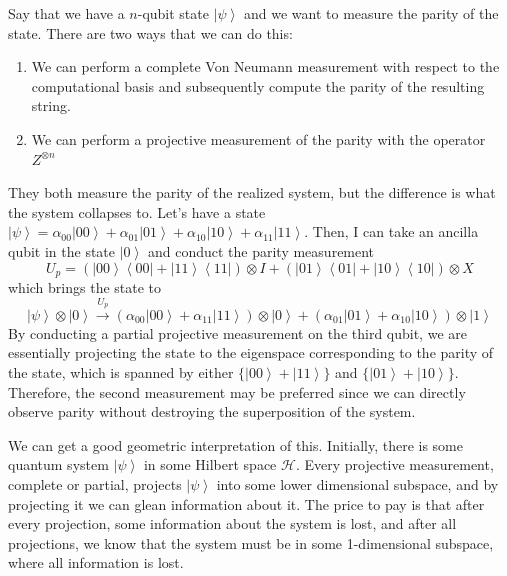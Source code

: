 \documentclass{article}
\newcommand{\ket}[1]{\ensuremath{\left|#1\right\rangle}}
\newcommand{\bra}[1]{\ensuremath{\left\langle#1\right|}}
\begin{document}
    \begin{example}
      Say that we have a $n$-qubit state $\ket{\psi}$ and we want to measure the parity of the state. There are two ways that we can do this: 
      \begin{enumerate}
        \item We can perform a complete Von Neumann measurement with respect to the computational basis and subsequently compute the parity of the resulting string. 
        \item We can perform a projective measurement of the parity with the operator $Z^{\otimes n}$ 
      \end{enumerate}
      They both measure the parity of the realized system, but the difference is what the system collapses to. Let's have a state $\ket{\psi} = \alpha_{00} \ket{00} + \alpha_{01} \ket{01} + \alpha_{10} \ket{10} + \alpha_{11} \ket{11}$. Then, I can take an ancilla qubit in the state $\ket{0}$ and conduct the parity measurement 
      \begin{equation}
        U_p = (\ket{00} \bra{00} + \ket{11} \bra{11}) \otimes I + (\ket{01} \bra{01} + \ket{10} \bra{10}) \otimes X
      \end{equation}
      which brings the state to 
      \begin{equation} 
        \ket{\psi} \otimes \ket{0} \xrightarrow{U_p} (\alpha_{00} \ket{00} + \alpha_{11} \ket{11}) \otimes \ket{0} + (\alpha_{01} \ket{01} + \alpha_{10} \ket{10}) \otimes \ket{1}
      \end{equation}
      By conducting a partial projective measurement on the third qubit, we are essentially projecting the state to the eigenspace corresponding to the parity of the state, which is spanned by either $\{\ket{00} + \ket{11}\}$ and $\{\ket{01} + \ket{10}\}$. Therefore, the second measurement may be preferred since we can directly observe parity without destroying the superposition of the system.
    \end{example}

    We can get a good geometric interpretation of this. Initially, there is some quantum system $\ket{\psi}$ in some Hilbert space $\mathcal{H}$. Every projective measurement, complete or partial, projects $\ket{\psi}$ into some lower dimensional subspace, and by projecting it we can glean information about it. The price to pay is that after every projection, some information about the system is lost, and after all projections, we know that the system must be in some 1-dimensional subspace, where all information is lost.  
\end{document}
